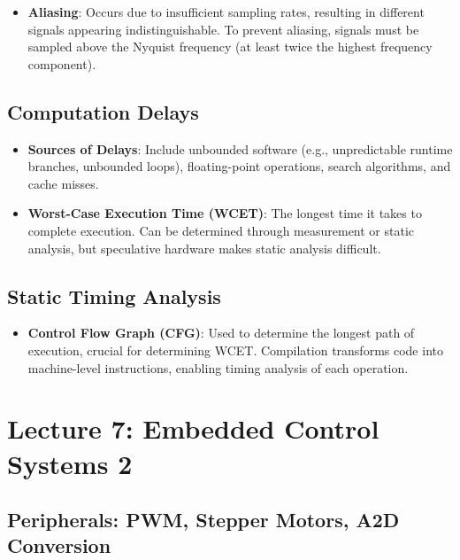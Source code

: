 \documentclass[
  14pt,
  a4paper,
  DIV=11,
  numbers=noendperiod,
  headinclude=true,
  footinclude=true]{scrreprt}
\providecommand{\tightlist}{%
  \setlength{\itemsep}{0pt}\setlength{\parskip}{0pt}}\usepackage{longtable,booktabs,array}
\begin{document}
\begin{itemize}
\tightlist
\item
  \textbf{Aliasing}: Occurs due to insufficient sampling rates,
  resulting in different signals appearing indistinguishable. To prevent
  aliasing, signals must be sampled above the Nyquist frequency (at
  least twice the highest frequency component).
\end{itemize}

\section{Computation Delays}\label{computation-delays}

\begin{itemize}
\tightlist
\item
  \textbf{Sources of Delays}: Include unbounded software (e.g.,
  unpredictable runtime branches, unbounded loops), floating-point
  operations, search algorithms, and cache misses.
\item
  \textbf{Worst-Case Execution Time (WCET)}: The longest time it takes
  to complete execution. Can be determined through measurement or static
  analysis, but speculative hardware makes static analysis difficult.
\end{itemize}

\section{Static Timing Analysis}\label{static-timing-analysis}

\begin{itemize}
\tightlist
\item
  \textbf{Control Flow Graph (CFG)}: Used to determine the longest path
  of execution, crucial for determining WCET. Compilation transforms
  code into machine-level instructions, enabling timing analysis of each
  operation.
\end{itemize}

\chapter{Lecture 7: Embedded Control Systems
2}\label{lecture-7-embedded-control-systems-2}

\section{Peripherals: PWM, Stepper Motors, A2D
Conversion}\label{peripherals-pwm-stepper-motors-a2d-conversion}
\end{document}
